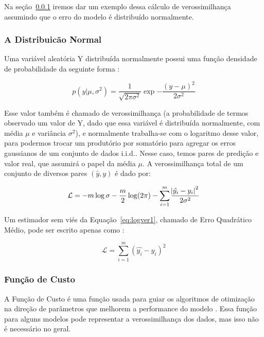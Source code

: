 Na seção~\ref{sec:reglog} iremos dar um exemplo dessa cálculo de verossimilhança
assumindo que o erro do modelo é distribuído normalmente.

\subsubsection{A Distribuicão Normal}
\label{sec:reglog}

Uma variável aleatória Y distribuída normalmente possui uma função densidade de
probabilidade da seguinte forma \citep{mlprob}:

\begin{equation}
  \label{eq:ver}
p(y| \mu,\sigma^2) = \frac{1}{\sqrt{2\pi\sigma^2}}\exp{-\frac{(y - \mu)^2}{2\sigma^2}}
\end{equation}

Esse valor também é chamado de verossimilhança (a probabilidade de termos
observado um valor de Y, dado que essa variável é distribuída normalmente, com média $\mu$ e variância $\sigma^2$), e
normalmente trabalha-se com o logaritmo desse valor, para podermos trocar um
produtório por somatório para agregar os erros gaussianos de um conjunto de dados
i.i.d.. Nesse caso, temos pares de predição e valor real, que assumirá o papel
da média $\mu$. A verossimilhança total de um conjunto de diversos pares
$(\hat{y},y)$ é dado por: 

\begin{equation}
\label{eq:logver1}
  \mathcal{L}= -m \log \sigma - \frac{m}{2} \log (2 \pi) - \sum^m_{i=1}
  \frac{\abs{\hat{y_i}-y_i}^2}{2 \sigma^2}
\end{equation}

Um estimador sem viés da Equação~\ref{eq:logver1}, chamado de Erro Quadrático
Médio, pode ser escrito apenas como \citep{mlprob}:

\begin{equation}
  \label{eq:logver2}
  \mathcal{L}=  \sum^m_{i=1} (\hat{y_i}-y_i)^2
\end{equation}


\subsubsection{Função de Custo}

A Função de Custo é uma função usada para guiar os algoritmos de otimização na
direção de parâmetros que melhorem a performance do modelo \citep{dlbook}.
Essa função para alguns modelos pode representar a verossimilhança dos dados,
mas isso não é necessário no geral.

